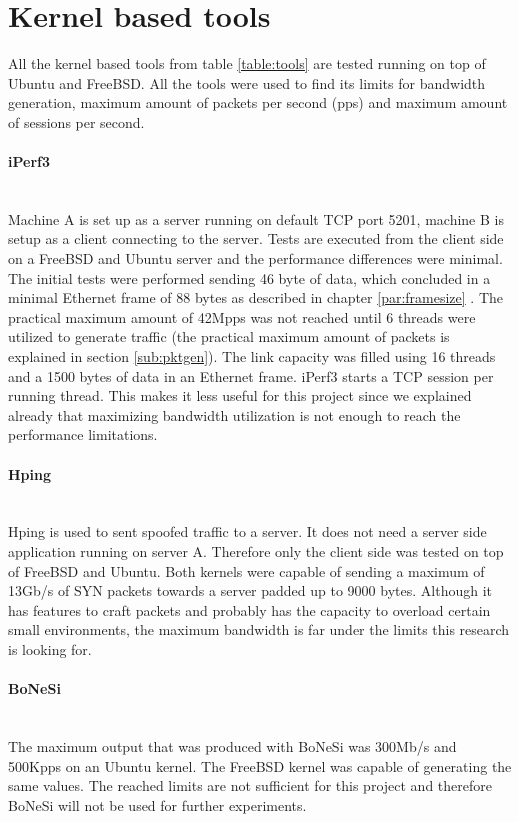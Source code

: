 \section{Kernel based tools}
All the kernel based tools from table \ref{table:tools} are tested running on top of Ubuntu and FreeBSD.
All the tools were used to find its limits for bandwidth generation, maximum amount of packets per second (pps) and maximum amount of sessions per second.

\paragraph{iPerf3}\mbox{}\\
Machine A is set up as a server running on default TCP port 5201, machine B is setup as a client connecting to the server. 
Tests are executed from the client side on a FreeBSD and Ubuntu server and the performance differences were minimal. 
The initial tests were performed sending 46 byte of data, which concluded in a minimal Ethernet frame of 88 bytes as described in chapter \ref{par:framesize} . 
The practical maximum amount of 42Mpps was not reached until 6 threads were utilized to generate traffic (the practical maximum amount of packets is explained in section \ref{sub:pktgen}). 
The link capacity was filled using 16 threads and a 1500 bytes of data in an Ethernet frame. 
iPerf3 starts a TCP session per running thread. This makes it less useful for this project since we explained already that maximizing bandwidth utilization is not enough to reach the performance limitations.

\paragraph{Hping}\mbox{}\\
Hping is used to sent spoofed traffic to a server. 
It does not need a server side application running on server A. Therefore only the client side was tested on top of FreeBSD and Ubuntu.
Both kernels were capable of sending a maximum of 13Gb/s of SYN packets towards a server padded up to 9000 bytes. Although it has features to craft packets and probably has the capacity to overload certain small environments, the maximum bandwidth is far under the limits this research is looking for.  

\paragraph{BoNeSi}\mbox{}\\
The maximum output that was produced with BoNeSi was 300Mb/s and 500Kpps on an Ubuntu kernel. 
The FreeBSD kernel was capable of generating the same values.
The reached limits are not sufficient for this project and therefore BoNeSi will not be used for further experiments. 

